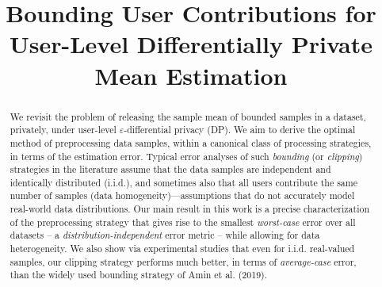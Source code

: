 \documentclass[conference,letterpaper]{IEEEtran}
\theoremstyle{remark}
\theoremstyle{definition}
\begin{document}
\title{Bounding User Contributions for User-Level Differentially Private Mean Estimation}
\author{
	\and
}
\IEEEoverridecommandlockouts
\maketitle

\begin{abstract}
	We revisit the problem of releasing the sample mean of bounded samples in a dataset, privately, under user-level $\varepsilon$-differential privacy (DP). We aim to derive the optimal method of preprocessing data samples, within a canonical class of processing strategies, in terms of the estimation error. Typical error analyses of such \emph{bounding} (or \emph{clipping}) strategies in the literature assume that the data samples are independent and identically distributed (i.i.d.), and sometimes also that all users contribute the same number of samples (data homogeneity)---assumptions that do not accurately model real-world data distributions. Our main result in this work is a precise characterization of the preprocessing strategy that gives rise to the smallest \emph{worst-case} error over all datasets -- a \emph{distribution-independent} error metric -- while allowing for data heterogeneity. We also show via experimental studies that even for i.i.d. real-valued samples, our clipping strategy performs much better, in terms of \emph{average-case} error, than the widely used bounding strategy of Amin et al. (2019).
\end{abstract}
\end{document}
